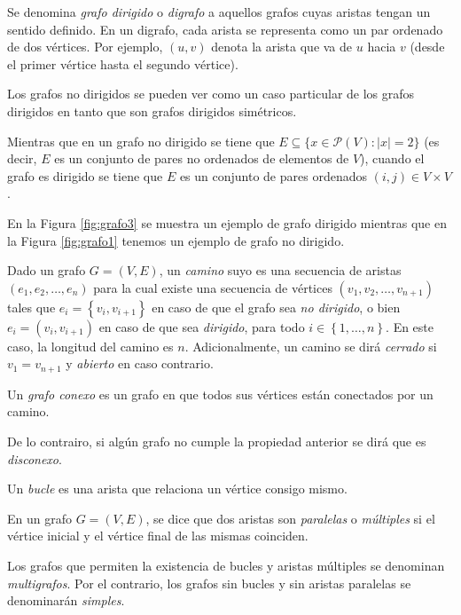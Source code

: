 \begin{definition}
Se denomina \emph{grafo dirigido} o \emph{digrafo} a aquellos grafos cuyas aristas tengan un sentido definido. En un digrafo, cada arista se representa como un par ordenado de dos vértices. Por ejemplo, $(u,v)$ denota la arista que va de $u$ hacia $v$ (desde el primer vértice hasta el segundo vértice).

Los grafos no dirigidos se pueden ver como un caso particular de los grafos dirigidos en tanto que son grafos dirigidos simétricos.

Mientras que en un grafo no dirigido se tiene que $E \subseteq \{x \in \mathcal{P}(V) : |x| = 2\}$ (es decir, $E$ es un conjunto de pares no ordenados de elementos de $V$), cuando el grafo es dirigido se tiene que $E$ es un conjunto de pares ordenados $(i,j) \in V \times V$.
\end{definition}

\begin{exampleth}
En la Figura \ref{fig:grafo3} se muestra un ejemplo de grafo dirigido mientras que en la Figura \ref{fig:grafo1} tenemos un ejemplo de grafo no dirigido.
\end{exampleth}

\begin{definition}\label{def:conexo}
Dado un grafo $G=(V,E)$, un \emph{camino} suyo es una secuencia de aristas $(e_1,e_2,\dots,e_n)$ para la cual existe una secuencia de vértices $(v_1,v_2,\dots,v_{n+1})$ tales que $e_i = \left\lbrace v_i,v_{i+1} \right\rbrace$ en caso de que el grafo sea \emph{no dirigido}, o bien $e_i = (v_i, v_{i+1})$ en caso de que sea \emph{dirigido}, para todo $i \in \left\lbrace 1,\dots,n \right\rbrace$. En este caso, la longitud del camino es $n$. Adicionalmente, un camino se dirá \emph{cerrado} si $v_1 = v_{n+1}$ y \emph{abierto} en caso contrario.

Un \emph{grafo conexo} es un grafo en que todos sus vértices están conectados por un camino.

De lo contrairo, si algún grafo no cumple la propiedad anterior se dirá que es \emph{disconexo}.
\end{definition}

\begin{definition}
Un \emph{bucle} es una arista que relaciona un vértice consigo mismo.
\end{definition}

\begin{definition}
En un grafo $G=(V,E)$, se dice que dos aristas son \emph{paralelas} o \emph{múltiples} si el vértice inicial y el vértice final de las mismas coinciden. 

Los grafos que permiten la existencia de bucles y aristas múltiples se denominan \emph{multigrafos}. Por el contrario, los grafos sin bucles y sin aristas paralelas se denominarán \emph{simples}.
\end{definition}


